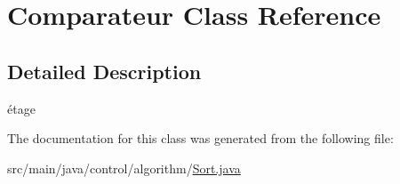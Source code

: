 \hypertarget{class_comparateur}{}\section{Comparateur Class Reference}
\label{class_comparateur}


\subsection{Detailed Description}
étage 

The documentation for this class was generated from the following file\+:\begin{DoxyCompactItemize}
\item 
src/main/java/control/algorithm/\mbox{\hyperlink{_sort_8java}{Sort.\+java}}\end{DoxyCompactItemize}
